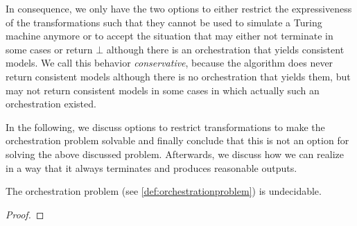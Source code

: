 In consequence, we only have the two options to either restrict the expressiveness of the transformations such that they cannot be used to simulate a Turing machine anymore or to accept the situation that  may either not terminate in some cases or return $\bot$ although there is an orchestration that yields consistent models.
We call this behavior \emph{conservative}, because the algorithm does never return consistent models although there is no orchestration that yields them, but may not return consistent models in some cases in which actually such an orchestration existed.

In the following, we discuss options to restrict transformations to make the orchestration problem solvable and finally conclude that this is not an option for solving the above discussed problem.
Afterwards, we discuss how we can realize  in a way that it always terminates and produces reasonable outputs.

\begin{corollary}
    The orchestration problem (see \autoref{def:orchestrationproblem}) is undecidable.
\end{corollary}
\begin{proof}
\end{proof}



